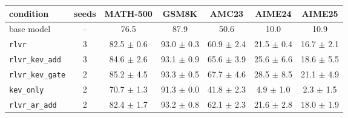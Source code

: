\begin{tabular}{@{}lcccccc@{}}
\toprule
condition & seeds & MATH-500 & GSM8K & AMC23 & AIME24 & AIME25 \\ \midrule
base model & -- & 76.5 & 87.9 & 50.6 & 10.0 & 10.9 \\ \midrule
\texttt{rlvr} & 3 & 82.5 $\pm$ 0.6 & 93.0 $\pm$ 0.3 & 60.9 $\pm$ 2.4 & 21.5 $\pm$ 0.4 & 16.7 $\pm$ 2.1 \\
\texttt{rlvr\_kev\_add} & 3 & 84.6 $\pm$ 2.6 & 93.1 $\pm$ 0.9 & 65.6 $\pm$ 3.9 & 25.6 $\pm$ 6.6 & 18.6 $\pm$ 5.5 \\
\texttt{rlvr\_kev\_gate} & 2 & 85.2 $\pm$ 4.5 & 93.3 $\pm$ 0.5 & 67.7 $\pm$ 4.6 & 28.5 $\pm$ 8.5 & 21.1 $\pm$ 4.9 \\
\texttt{kev\_only} & 2 & 70.7 $\pm$ 1.3 & 91.3 $\pm$ 0.0 & 41.8 $\pm$ 2.3 & 4.9 $\pm$ 1.0 & 2.3 $\pm$ 1.5 \\
\texttt{rlvr\_ar\_add} & 2 & 82.4 $\pm$ 1.7 & 93.2 $\pm$ 0.8 & 62.1 $\pm$ 2.3 & 21.6 $\pm$ 2.8 & 18.0 $\pm$ 1.9 \\
\bottomrule
\end{tabular}
